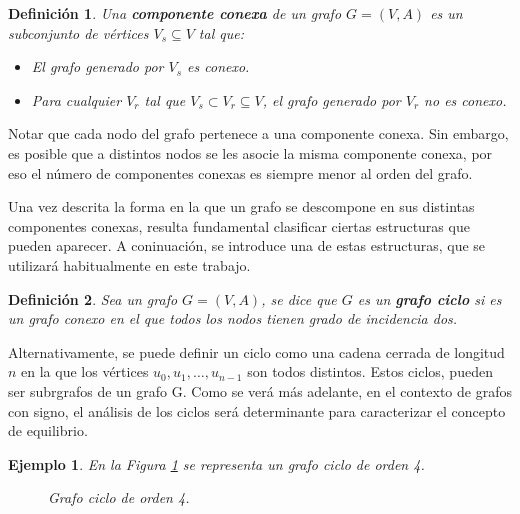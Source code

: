 \documentclass[11pt,a4paper,spanish]{report}
\theoremstyle{plain}
\newtheorem{definicion}{Definición}[chapter]
\newtheorem{ejemplo}{Ejemplo}[chapter]
\begin{document}
 \begin{definicion}\cite{gross2018graph}
 Una \textbf{componente conexa} de un grafo $G = (V,A)$ es un subconjunto de vértices $V_s \subseteq V$ tal que:

\begin{itemize}
    \item[(i)] El grafo generado por $V_s$ es conexo.
    
    \item[(ii)] Para cualquier $V_r$ tal que $V_s \subset V_r \subseteq V$, el grafo generado por $V_r$ no es conexo.
\end{itemize}
 \end{definicion}
Notar que cada nodo del grafo pertenece a una componente conexa. Sin embargo, es posible que a distintos nodos se les asocie la misma componente conexa, por eso el número de componentes conexas es siempre menor al orden del grafo.

Una vez descrita la forma en la que un grafo se descompone en sus distintas componentes conexas, resulta fundamental clasificar ciertas estructuras que pueden aparecer. A coninuación, se introduce una de estas estructuras, que se utilizará habitualmente en este trabajo.

\begin{definicion}\cite{gross2018graph}
Sea un grafo $G=(V,A)$, se dice que $G$ es un \textbf{ grafo ciclo} si es un grafo conexo en el que todos los nodos tienen grado de incidencia dos. 
\end{definicion}

Alternativamente, se puede definir un ciclo como una cadena cerrada de longitud $n$ en la que los vértices $u_0, u_1, \dots, u_{n-1}$ son todos distintos. Estos ciclos, pueden ser subrgrafos de un grafo G.
Como se verá más adelante, en el contexto de grafos con signo, el análisis de
los ciclos será determinante para caracterizar el concepto de equilibrio.

\begin{ejemplo} En la Figura \ref{fig:grafo ciclo G7} se representa un grafo ciclo de orden 4.
 \begin{figure}[H]
\begin{center}
\end{center}
     \caption{{Grafo ciclo de orden 4.}}
     \label{fig:grafo ciclo G7}
 \end{figure}
\end{ejemplo}
\end{document}
